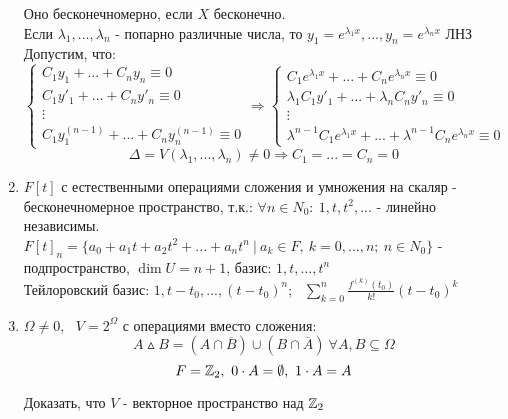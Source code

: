 \begin{enumerate}
    Оно бесконечномерно, если $X$ бесконечно.\\
    Если $\lambda_1, ..., \lambda_n$ - попарно различные числа, то $y_1 = e^{\lambda_1x},..., y_n = e^{\lambda_nx}$ ЛНЗ\\
    Допустим, что:
    $$\begin{cases}
      C_1y_1 + ... + C_ny_n \equiv 0\\
      C_1y'_1 + ... + C_ny'_n \equiv 0\\
      \vdots\\
      C_1y_1^{(n-1)} + ... + C_ny_n^{(n-1)} \equiv 0
    \end{cases} \Longrightarrow \begin{cases}
      C_1e^{\lambda_1x} + ... + C_ne^{\lambda_nx} \equiv 0\\
      \lambda_1C_1y'_1 + ... + \lambda_nC_ny'_n \equiv 0\\
      \vdots\\
      \lambda^{n-1}C_1e^{\lambda_1x} + ... + \lambda^{n-1}C_ne^{\lambda_nx} \equiv 0
    \end{cases}$$
    $$\Delta = V(\lambda_1,...,\lambda_n) \neq 0 \Longrightarrow C_1 = ... = C_n = 0$$
    \item $F[t]$ с естественными операциями сложения и умножения на скаляр - бесконечномерное пространство, т.к.: $\forall n \in N_0: \ 1, t, t^2,...$ - линейно независимы.\\
    $F[t]_n = \{a_0+a_1t+a_2t^2+...+a_nt^n \ | \ a_k\in F, \ k=0,...,n; \ n \in N_0\} $ - подпространство, $\dim U = n+1$, базис: $1,t,...,t^n$\\
    Тейлоровский базис: $1, t-t_0,...,(t-t_0)^n$; \ $\sum \limits_{k=0}^n\frac{f^{(k)}(t_0)}{k!}(t-t_0)^k$ 
    \item $\varOmega \neq 0$, \ $V = 2^\varOmega $ с операциями вместо сложения:
    $$A\vartriangle B = (A\cap \overline{B}) \cup (B\cap \overline{A}) \ \forall A,B \subseteq \varOmega$$
    $$F = \mathbb Z_2,  \ 0\cdot A = \emptyset , \ 1 \cdot A = A$$
    \begin{exercise}
      Доказать, что $V$ - векторное пространство над $\mathbb Z_2$
    \end{exercise}   
  \end{enumerate}
  
